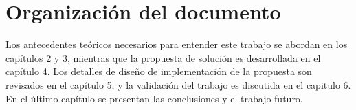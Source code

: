 \begin{intro}
\begin{itemize}
	\end{itemize}

	\section{Organización del documento}

	Los antecedentes teóricos necesarios para entender este trabajo se abordan en los capítulos 2 y 3, mientras que la propuesta de solución es desarrollada en el capítulo 4. Los detalles de diseño de implementación de la propuesta son revisados en el capítulo 5, y la validación del trabajo es discutida en el capitulo 6. En el último capítulo se presentan las conclusiones y el trabajo futuro.

\end{intro}
